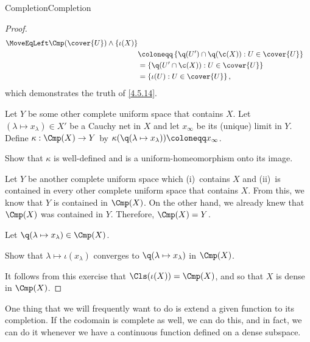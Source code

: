 \begin{thm}{Completion}{Completion}
\begin{proof}
\begin{equation}
\begin{split}
\MoveEqLeft
\Cmp (\cover{U}) \wedge \{ \iota (X)\} \\
& \coloneqq \left\{ \q (U')\cap \q (\c (X)):U\in \cover{U}\right\}  \\
& =\left\{ \q (U'\cap \c (X)):U\in \cover{U}\right\} \\
& =\left\{ \iota (U):U\in \cover{U}\right\} ,
\end{split}
\end{equation}
which demonstrates the truth of \eqref{4.5.14}.

Let $Y$ be some other complete uniform space that contains $X$.  Let $(\lambda \mapsto x_{\lambda})\in X'$ be a Cauchy net in $X$ and let $x_\infty$ be its (unique) limit in $Y$.  Define $\kappa :\Cmp (X)\rightarrow Y$ by $\kappa (\q (\lambda \mapsto x_{\lambda})) \coloneqq x_\infty$.
\begin{exr}[breakable=false]{}{}
Show that $\kappa$ is well-defined and is a uniform-homeomorphism onto its image.
\end{exr}

Let $Y$ be another complete uniform space which (i)~contains $X$ and (ii)~is contained in every other complete uniform space that contains $X$.  From this, we know that $Y$ is contained in $\Cmp (X)$.  On the other hand, we already knew that $\Cmp (X)$ was contained in $Y$.  Therefore, $\Cmp (X)=Y$.

Let $\q (\lambda \mapsto x_{\lambda})\in \Cmp (X)$.
\begin{exr}[breakable=false]{}{}
Show that $\lambda \mapsto \iota (x_\lambda )$ converges to $\q (\lambda \mapsto x_{\lambda})$ in $\Cmp (X)$.
\end{exr}
It follows from this exercise that $\Cls (\iota (X))=\Cmp (X)$, and so that $X$ is dense in $\Cmp (X)$.
\end{proof}
\end{thm}
One thing that we will frequently want to do is extend a given function to its completion.  If the codomain is complete as well, we can do this, and in fact, we can do it whenever we have a continuous function defined on a dense subspace.
